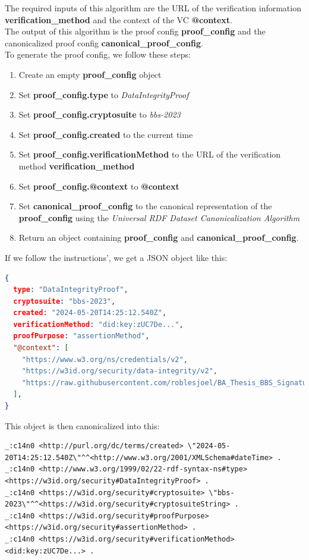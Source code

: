 \documentclass[
	a4paper               %
	,BCOR=0mm            %
	,bibliography=totoc   %
	,listof=totoc         %
	,monolingual
	,twoside=false
]{bfhthesis}              %
\begin{document}
The required inputs of this algorithm are the URL of the verification information \textbf{verification\_method} and the context of the VC \textbf{@context}.\\

The output of this algorithm is the proof config \textbf{proof\_config} and the canonicalized proof config \textbf{canonical\_proof\_config}.\\

To generate the proof config, we follow these steps:
\begin{enumerate}
	\item Create an empty \textbf{proof\_config} object
	\item Set \textbf{proof\_config.type} to \textit{DataIntegrityProof}
	\item Set \textbf{proof\_config.cryptosuite} to \textit{bbs-2023}
	\item Set \textbf{proof\_config.created} to the current time
	\item Set \textbf{proof\_config.verificationMethod} to the URL of the verification method \textbf{verification\_method}
	\item Set \textbf{proof\_config.@context} to \textbf{@context}
	\item Set \textbf{canonical\_proof\_config} to the canonical representation of the \textbf{proof\_config} using the \textit{Universal RDF Dataset Canonicalization Algorithm}\cite{rdf}
	\item Return an object containing \textbf{proof\_config} and \textbf{canonical\_proof\_config}.
\end{enumerate}

If we follow the instructions', we get a JSON object like this:
\begin{lstlisting}[language=json,firstnumber=1,caption={Example Proof Config},captionpos=b]
{
  type: "DataIntegrityProof",
  cryptosuite: "bbs-2023",
  created: "2024-05-20T14:25:12.540Z",
  verificationMethod: "did:key:zUC7De...",
  proofPurpose: "assertionMethod",
  "@context": [
    "https://www.w3.org/ns/credentials/v2",
    "https://w3id.org/security/data-integrity/v2",
    "https://raw.githubusercontent.com/roblesjoel/BA_Thesis_BBS_Signatures/docs/context/example_1.jsonld",
  ],
}
\end{lstlisting}

This object is then canonicalized into this:
\begin{lstlisting}[language=canon,firstnumber=1,caption={Example Proof Config canonicalized},captionpos=b]
_:c14n0 <http://purl.org/dc/terms/created> \"2024-05-20T14:25:12.540Z\"^^<http://www.w3.org/2001/XMLSchema#dateTime> .
_:c14n0 <http://www.w3.org/1999/02/22-rdf-syntax-ns#type> <https://w3id.org/security#DataIntegrityProof> .
_:c14n0 <https://w3id.org/security#cryptosuite> \"bbs-2023\"^^<https://w3id.org/security#cryptosuiteString> .
_:c14n0 <https://w3id.org/security#proofPurpose> <https://w3id.org/security#assertionMethod> .
_:c14n0 <https://w3id.org/security#verificationMethod> <did:key:zUC7De...> .
\end{lstlisting}
\end{document}
